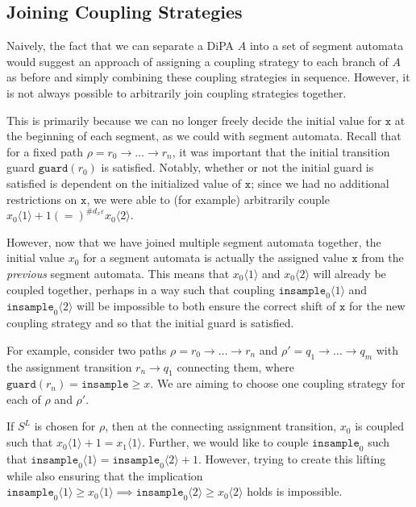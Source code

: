 \documentclass[12pt]{article}
\newcommand{\gguard}[1][x]{\texttt{insample}\geq #1}
\newcommand{\brangle}[1]{\langle #1 \rangle}
\newcommand{\guard}{\texttt{guard}}
\theoremstyle{definition}
\begin{document}
\subsection{Joining Coupling Strategies}

Naively, the fact that we can separate a DiPA $A$ into a set of segment automata would suggest an approach of assigning a coupling strategy to each branch of $A$ as before and simply combining these coupling strategies in sequence. However, it is not always possible to arbitrarily join coupling strategies together. 

This is primarily because we can no longer freely decide the initial value for $\texttt{x}$ at the beginning of each segment, as we could with segment automata. Recall that for a fixed path $\rho = r_0\to\ldots\to r_n$, it was important that the initial transition guard $\guard(r_0)$ is satisfied. 
Notably, whether or not the initial guard is satisfied is dependent on the initialized value of $\texttt{x}$; since we had no additional restrictions on $\texttt{x}$, we were able to (for example) arbitrarily couple $x_0\brangle{1}+1(=)^{\#d_x\varepsilon}x_0\brangle{2}$.

However, now that we have joined multiple segment automata together, the initial value $x_0$ for a segment automata is actually the assigned value $\texttt{x}$ from the \textit{previous} segment automata. 
This means that $x_0\brangle{1}$ and $x_0\brangle{2}$ will already be coupled together, perhaps in a way such that coupling $\texttt{insample}_0\brangle{1}$ and $\texttt{insample}_0\brangle{2}$ will be impossible to both ensure the correct shift of $\texttt{x}$ for the new coupling strategy and so that the initial guard is satisfied.

For example, consider two paths $\rho = r_0\to\ldots\to r_n$ and $\rho' = q_1\to \ldots \to q_m$ with the assignment transition $r_n\to q_1$ connecting them, where $\guard(r_n) = \gguard$. We are aiming to choose one coupling strategy for each of $\rho$ and $\rho'$. 

If $S^L$ is chosen for $\rho$, then at the connecting assignment transition, $x_0$ is coupled such that $x_0\brangle{1}+1 =x_1\brangle{1}$. Further, we would like to couple $\texttt{insample}_0$ such that $\texttt{insample}_0\brangle{1} = \texttt{insample}_0\brangle{2}+1$. However, trying to create this lifting while also ensuring that the implication $\texttt{insample}_0\brangle{1} \geq x_0\brangle{1}\implies \texttt{insample}_0\brangle{2} \geq x_0\brangle{2}$ holds is impossible. 
\end{document}

